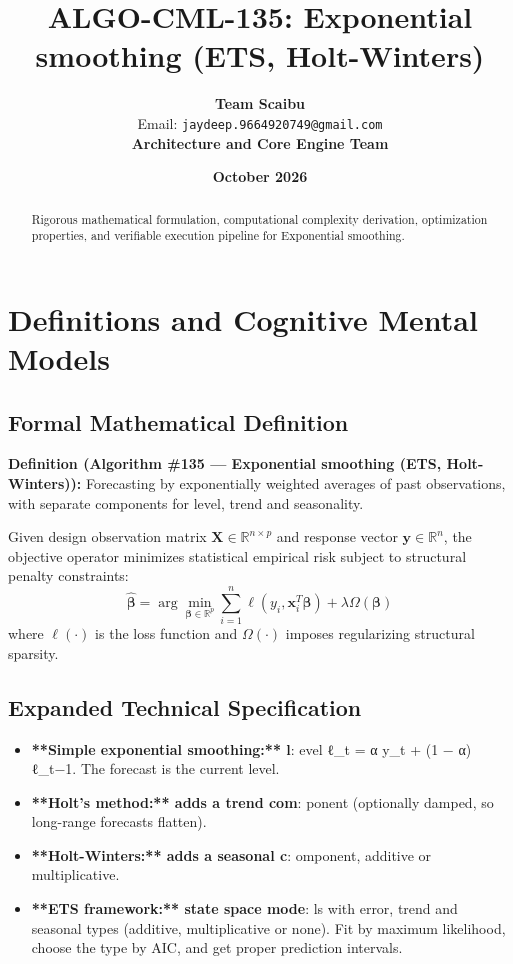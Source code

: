 \documentclass[11pt,a4paper]{article}
\title{\textbf{ALGO-CML-135: Exponential smoothing (ETS, Holt-Winters)}}
\author{\textbf{Team Scaibu} \\ \small Email: \texttt{jaydeep.9664920749@gmail.com} \\ \small \textbf{Architecture and Core Engine Team}}
\date{\textbf{October 2026}}
\theoremstyle{definition}
\begin{document}
\maketitle

\begin{abstract}
Rigorous mathematical formulation, computational complexity derivation, optimization properties, and verifiable execution pipeline for Exponential smoothing.
\end{abstract}

\section{Definitions and Cognitive Mental Models}

\subsection{Formal Mathematical Definition}
\textbf{Definition (Algorithm \#135 --- Exponential smoothing (ETS, Holt-Winters)):}
Forecasting by exponentially weighted averages of past observations, with separate components for level, trend and seasonality.

Given design observation matrix $\mathbf{X} \in \mathbb{R}^{n \times p}$ and response vector $\mathbf{y} \in \mathbb{R}^n$, the objective operator minimizes statistical empirical risk subject to structural penalty constraints:
\begin{equation}
\hat{\boldsymbol{\beta}} = \arg\min_{\boldsymbol{\beta} \in \mathbb{R}^p} \sum_{i=1}^n \ell(y_i, \mathbf{x}_i^T \boldsymbol{\beta}) + \lambda \Omega(\boldsymbol{\beta})
\end{equation}
where $\ell(\cdot)$ is the loss function and $\Omega(\cdot)$ imposes regularizing structural sparsity.

\subsection{Expanded Technical Specification}
\begin{itemize}
\item \textbf{**Simple exponential smoothing:** l}: evel ℓ\_t = α y\_t + (1 − α) ℓ\_{t−1}. The forecast is the current level.
\item \textbf{**Holt's method:** adds a trend com}: ponent (optionally damped, so long-range forecasts flatten).
\item \textbf{**Holt-Winters:** adds a seasonal c}: omponent, additive or multiplicative.
\item \textbf{**ETS framework:** state space mode}: ls with error, trend and seasonal types (additive, multiplicative or none). Fit by maximum likelihood, choose the type by AIC, and get proper prediction intervals.
\end{itemize}
\end{document}
